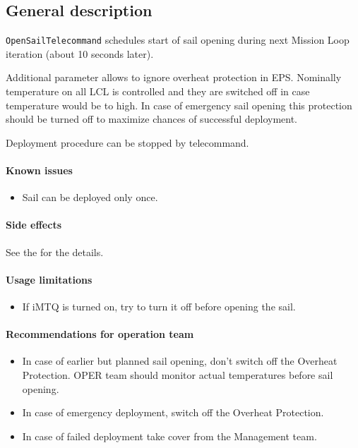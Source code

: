 

\subsection{General description}


\texttt{OpenSailTelecommand} schedules start of sail opening during next Mission Loop iteration (about 10 seconds later). 

Additional parameter allows to ignore overheat protection in EPS.
Nominally temperature on all LCL is controlled and they are switched off in case temperature would be to high. In case of emergency sail opening this protection should be turned off to maximize chances of successful deployment.

Deployment procedure can be stopped by  telecommand.

\paragraph{Known issues}
\begin{itemize}
	\item Sail can be deployed only once. 
\end{itemize}

\paragraph{Side effects}

See the  for the details.

\paragraph{Usage limitations}
\begin{itemize}
	\item If iMTQ is turned on, try to turn it off before opening the sail.
\end{itemize}

\paragraph{Recommendations for operation team}
\begin{itemize}
    \item In case of earlier but planned sail opening, don't switch off the Overheat Protection. OPER team should monitor actual temperatures before sail opening.
	\item In case of emergency deployment, switch off the Overheat Protection.
	\item In case of failed deployment take cover from the Management team.
\end{itemize}


